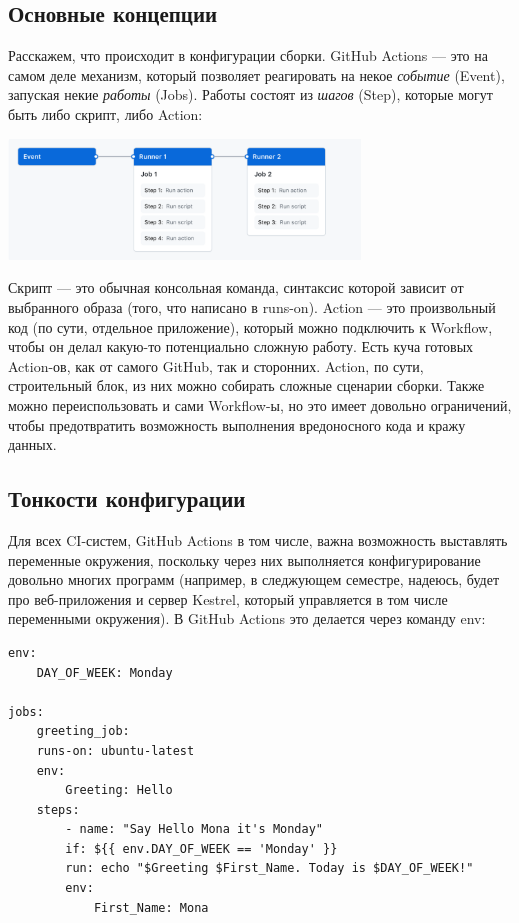 \documentclass{../../text-style}
\begin{document}
\subsection{Основные концепции}

Расскажем, что происходит в конфигурации сборки. GitHub Actions --- это на самом деле механизм, который позволяет реагировать на некое \emph{событие} (Event), запуская некие \emph{работы} (Jobs). Работы состоят из \emph{шагов} (Step), которые могут быть либо скрипт, либо Action:

\begin{center}
    \includegraphics[width=0.7\textwidth]{githubActionsWorkflow.png}
\end{center}

Скрипт --- это обычная консольная команда, синтаксис которой зависит от выбранного образа (того, что написано в runs-on). Action --- это произвольный код (по сути, отдельное приложение), который можно подключить к Workflow, чтобы он делал какую-то потенциально сложную работу. Есть куча готовых Action-ов, как от самого GitHub, так и сторонних. Action, по сути, строительный блок, из них можно собирать сложные сценарии сборки. Также можно переиспользовать и сами Workflow-ы, но это имеет довольно ограничений, чтобы предотвратить возможность выполнения вредоносного кода и кражу данных.

\subsection{Тонкости конфигурации}

Для всех CI-систем, GitHub Actions в том числе, важна возможность выставлять переменные окружения, поскольку через них выполняется конфигурирование довольно многих программ (например, в следжующем семестре, надеюсь, будет про веб-приложения и сервер Kestrel, который управляется в том числе переменными окружения). В GitHub Actions это делается через команду env:

\begin{verbatim}
env:
    DAY_OF_WEEK: Monday

jobs:
    greeting_job:
    runs-on: ubuntu-latest
    env:
        Greeting: Hello
    steps:
        - name: "Say Hello Mona it's Monday"
        if: ${{ env.DAY_OF_WEEK == 'Monday' }}
        run: echo "$Greeting $First_Name. Today is $DAY_OF_WEEK!"
        env:
            First_Name: Mona
\end{verbatim}
\end{document}
